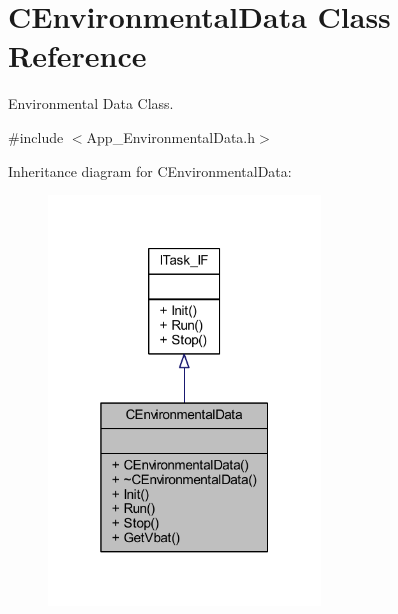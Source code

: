 \hypertarget{class_c_environmental_data}{}\section{C\+Environmental\+Data Class Reference}
\label{class_c_environmental_data}


Environmental Data Class.  




{\ttfamily \#include $<$App\+\_\+\+Environmental\+Data.\+h$>$}



Inheritance diagram for C\+Environmental\+Data\+:\nopagebreak
\begin{figure}[H]
\begin{center}
\leavevmode
\includegraphics[width=205pt]{class_c_environmental_data__inherit__graph}
\end{center}
\end{figure}


